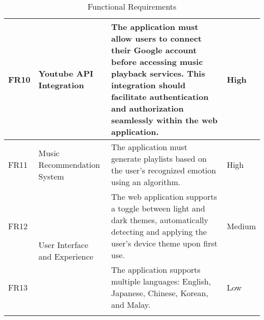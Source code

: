 \begin{longtable}{ |m{1cm}|m{3.5cm}|m{7cm}|m{1.5cm}| }
    \hline
    FR10 & Youtube API Integration & The application must allow users to connect their Google account before accessing music playback services. This integration should facilitate authentication and authorization seamlessly within the web application. & High \\
    \hline
    FR11 & Music Recommendation System & The application must generate playlists based on the user's recognized emotion using an algorithm. & High \\
    \hline
    FR12 & \multirow{2}{=}{User Interface and Experience} & The web application supports a toggle between light and dark themes, automatically detecting and applying the user's device theme upon first use. & Medium \\
    \cline{1-1} \cline{3-4}
    FR13 &  & The application supports multiple languages: English, Japanese, Chinese, Korean, and Malay. & Low \\
    \hline
    \caption{Functional Requirements} \\
\end{longtable}
\pagebreak
